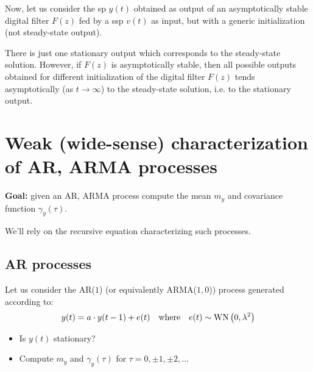 Now, let us consider the \gls{sp} $y(t)$ obtained as output of an asymptotically stable digital filter $F(z)$ fed by a \gls{ssp} $v(t)$ as input, but with a generic initialization (not steady-state output).

\begin{figure}[htpb]
	\centering
\end{figure}
\FloatBarrier

\begin{theorem}
	There is just one stationary output which corresponds to the steady-state solution. However, if $F(z)$ is asymptotically stable, then all possible outputs obtained for different initialization of the digital filter $F(z)$ tends asymptotically (as $t \rightarrow \infty$) to the steady-state solution, i.e. to the stationary output.
\end{theorem}


\section{Weak (wide-sense) characterization of AR, ARMA processes}
\textbf{Goal:} given an AR, ARMA process compute the mean $m_y$ and covariance function $\gamma_y(\tau)$.


We'll rely on the recursive equation characterizing such processes.

\subsection{AR processes}

Let us consider the AR($1$) (or equivalently ARMA($1,0$)) process generated according to:
\begin{align*}
	y(t)=a \cdot y(t-1)+e(t) \quad \text{where} \quad e(t) \sim \operatorname{WN}\left(0, \lambda^{2}\right)
\end{align*}

\begin{itemize}
	\item Is $y(t)$ stationary?
	\item Compute $m_{y}$ and $\gamma_{y}(\tau)$ for $\tau=0, \pm 1, \pm 2, \ldots$
\end{itemize}

